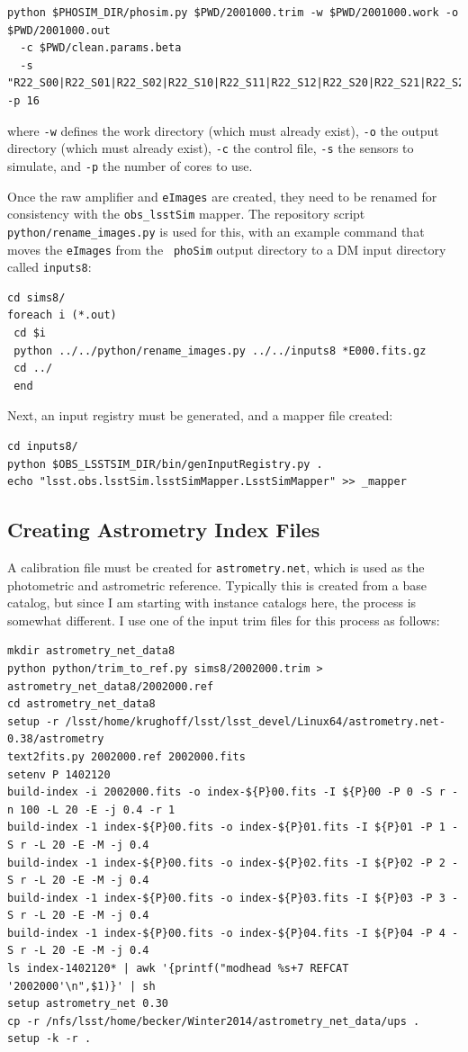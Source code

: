 \documentclass[DM,toc]{lsstdoc}
\begin{document}
{\small
\begin{Verbatim}[frame=single]
python $PHOSIM_DIR/phosim.py $PWD/2001000.trim -w $PWD/2001000.work -o $PWD/2001000.out
  -c $PWD/clean.params.beta
  -s "R22_S00|R22_S01|R22_S02|R22_S10|R22_S11|R22_S12|R22_S20|R22_S21|R22_S22" -p 16
\end{Verbatim}
}
where {\tt -w} defines the work directory (which must already exist),
{\tt -o} the output directory (which must already exist), {\tt -c} the
control file, {\tt -s} the sensors to simulate, and {\tt -p} the
number of cores to use.


Once the raw amplifier and {\tt eImages} are created, they need to be
renamed for consistency with the {\tt obs\_lsstSim} mapper.  The
repository script {\tt python/rename\_images.py} is used for this,
with an example command that moves the {\tt eImages} from the {\tt
  phoSim} output directory to a DM input directory called {\tt inputs8}:
{\small
\begin{Verbatim}[frame=single]
cd sims8/
foreach i (*.out)
 cd $i
 python ../../python/rename_images.py ../../inputs8 *E000.fits.gz
 cd ../
 end
\end{Verbatim}
}

Next, an input registry must be generated, and a mapper file created:

{\small
\begin{Verbatim}[frame=single]
cd inputs8/
python $OBS_LSSTSIM_DIR/bin/genInputRegistry.py .
echo "lsst.obs.lsstSim.lsstSimMapper.LsstSimMapper" >> _mapper
\end{Verbatim}
}

\subsection{Creating Astrometry Index Files}

A calibration file must be created for {\tt astrometry.net}, which is
used as the photometric and astrometric reference.  Typically this is
created from a base catalog, but since I am starting with instance
catalogs here, the process is somewhat different.  I use one of the
input trim files for this process as follows:

{\footnotesize
\begin{Verbatim}[frame=single]
mkdir astrometry_net_data8
python python/trim_to_ref.py sims8/2002000.trim > astrometry_net_data8/2002000.ref
cd astrometry_net_data8
setup -r /lsst/home/krughoff/lsst/lsst_devel/Linux64/astrometry.net-0.38/astrometry
text2fits.py 2002000.ref 2002000.fits
setenv P 1402120
build-index -i 2002000.fits -o index-${P}00.fits -I ${P}00 -P 0 -S r -n 100 -L 20 -E -j 0.4 -r 1
build-index -1 index-${P}00.fits -o index-${P}01.fits -I ${P}01 -P 1 -S r -L 20 -E -M -j 0.4
build-index -1 index-${P}00.fits -o index-${P}02.fits -I ${P}02 -P 2 -S r -L 20 -E -M -j 0.4
build-index -1 index-${P}00.fits -o index-${P}03.fits -I ${P}03 -P 3 -S r -L 20 -E -M -j 0.4
build-index -1 index-${P}00.fits -o index-${P}04.fits -I ${P}04 -P 4 -S r -L 20 -E -M -j 0.4
ls index-1402120* | awk '{printf("modhead %s+7 REFCAT '2002000'\n",$1)}' | sh
setup astrometry_net 0.30
cp -r /nfs/lsst/home/becker/Winter2014/astrometry_net_data/ups .
setup -k -r .
\end{Verbatim}
}
\end{document}
